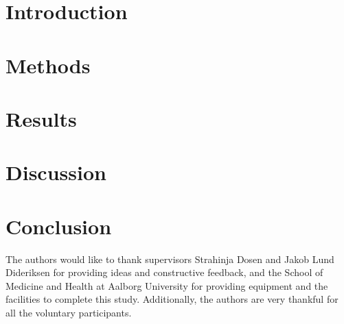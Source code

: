 \documentclass[journal]{IEEEtran}
\begin{document}
\IEEEpeerreviewmaketitle

\section{Introduction}
 

\section{Methods} \label{meth:pap}





%

















\section{Results} \label{res:pap}



\section{Discussion} \label{dis:pap}



\section{Conclusion} \label{con:pap}



\appendix[Acknowledgement]
The authors would like to thank supervisors Strahinja Dosen and Jakob Lund Dideriksen for providing ideas and constructive feedback, and the School of Medicine and Health at Aalborg University for providing equipment and the facilities to complete this study. Additionally, the authors are very thankful for all the voluntary participants. 


\end{document}
